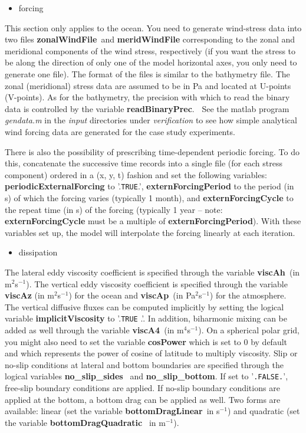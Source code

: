 \begin{itemize}
\item forcing
\end{itemize}

This section only applies to the ocean. You need to generate wind-stress
data into two files \textbf{zonalWindFile}\textit{\ }and \textbf{%
meridWindFile }corresponding to the zonal and meridional components of the
wind stress, respectively (if you want the stress to be along the direction
of only one of the model horizontal axes, you only need to generate one
file). The format of the files is similar to the bathymetry file. The zonal
(meridional) stress data are assumed to be in Pa and located at U-points
(V-points). As for the bathymetry, the precision with which to read the
binary data is controlled by the variable \textbf{readBinaryPrec}.\textbf{\ }
See the matlab program \textit{gendata.m }in the \textit{input }directories
under \textit{verification }to see how simple analytical wind forcing data
are generated for the case study experiments. 

There is also the possibility of prescribing time-dependent periodic
forcing. To do this, concatenate the successive time records into a single
file (for each stress component) ordered in a (x, y, t) fashion and set the
following variables: \textbf{periodicExternalForcing }to '.\texttt{TRUE}.', 
\textbf{externForcingPeriod }to the period (in s) of which the forcing
varies (typically 1 month), and \textbf{externForcingCycle }to the repeat
time (in s) of the forcing (typically 1 year -- note: \textbf{%
externForcingCycle }must be a multiple of \textbf{externForcingPeriod}).
With these variables set up, the model will interpolate the forcing linearly
at each iteration.

\begin{itemize}
\item dissipation
\end{itemize}

The lateral eddy viscosity coefficient is specified through the variable 
\textbf{viscAh}\textit{\ }(in m$^{2}$s$^{-1}$). The vertical eddy viscosity
coefficient is specified through the variable \textbf{viscAz }(in m$^{2}$s$%
^{-1}$) for the ocean and \textbf{viscAp}\textit{\ }(in Pa$^{2}$s$^{-1}$)
for the atmosphere. The vertical diffusive fluxes can be computed implicitly
by setting the logical variable \textbf{implicitViscosity }to '.\texttt{TRUE}%
.'. In addition, biharmonic mixing can be added as well through the variable 
\textbf{viscA4}\textit{\ }(in m$^{4}$s$^{-1}$). On a spherical polar grid,
you might also need to set the variable \textbf{cosPower} which is set to 0
by default and which represents the power of cosine of latitude to multiply
viscosity. Slip or no-slip conditions at lateral and bottom boundaries are
specified through the logical variables \textbf{no\_slip\_sides}\textit{\ }%
and \textbf{no\_slip\_bottom}. If set to '\texttt{.FALSE.}', free-slip
boundary conditions are applied. If no-slip boundary conditions are applied
at the bottom, a bottom drag can be applied as well. Two forms are
available: linear (set the variable \textbf{bottomDragLinear}\textit{\ }in s$%
^{-1}$) and quadratic (set the variable \textbf{bottomDragQuadratic}\textit{%
\ }in m$^{-1}$).

